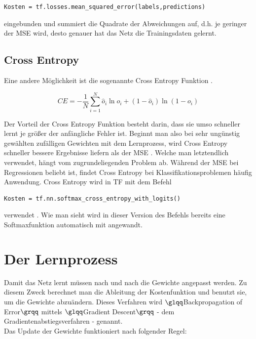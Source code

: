 \vspace{0.3cm}
\begin{lstlisting}
Kosten = tf.losses.mean_squared_error(labels,predictions)
\end{lstlisting}

eingebunden und summiert die Quadrate der Abweichungen auf, d.h. je geringer der \gls{MSE} wird, desto genauer hat das Netz die Trainingsdaten gelernt.


\subsection{Cross Entropy}
Eine andere M\"oglichkeit ist die sogenannte Cross Entropy Funktion \cite{Nielsen}.

\begin{equation}
CE= - \frac{1}{N} \sum_{i=1}^{N}\hat{o}_i \ln o_i + (1- \hat{o}_i) \ln (1-o_i)
\end{equation}

Der Vorteil der Cross Entropy Funktion besteht darin, dass sie umso schneller lernt je gr\"o\ss er der anf\"angliche Fehler ist. Beginnt man also bei sehr ung\"unstig gew\"ahlten zuf\"alligen Gewichten mit dem Lernprozess, wird Cross Entropy schneller bessere Ergebnisse liefern als der \gls{MSE} \cite{Nielsen}. Welche man letztendlich verwendet, h\"angt vom zugrundeliegenden Problem ab. Während der \gls{MSE} bei Regressionen beliebt ist, findet Cross Entropy bei Klassifikationsproblemen häufig Anwendung. Cross Entropy wird in \gls{TF} mit dem Befehl

\vspace{0.3cm} 
\begin{lstlisting}
Kosten = tf.nn.softmax_cross_entropy_with_logits()
\end{lstlisting}

verwendet \cite{cookbook}. Wie man sieht wird in dieser Version des Befehls bereits eine Softmaxfunktion automatisch mit angewandt.



\section{Der Lernprozess}
Damit das Netz lernt m\"ussen nach und nach die Gewichte angepasst werden. Zu diesem Zweck berechnet man die Ableitung der Kostenfunktion und benutzt sie, um die Gewichte abzu\"andern. Dieses Verfahren wird $\glqq$Backpropagation of Error$\grqq$ mittels $\glqq$Gradient Descent$\grqq$ - dem Gradientenabstiegsverfahren - genannt.\\
Das Update der Gewichte funktioniert nach folgender Regel: \cite{Rojas1996}


